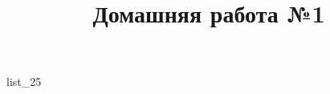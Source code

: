 \documentclass[12pt, a4paper]{article}
\begin{document}
	\title{Домашняя работа №1}
	{list_25}
\end{document}
